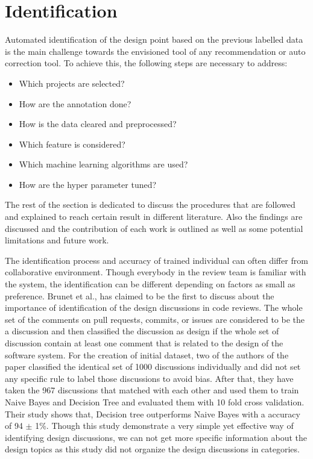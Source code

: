 \section{Identification}
\label{sect:identification}
Automated identification of the design point based on the previous labelled data is the main challenge towards the envisioned tool of any recommendation or auto correction tool. To achieve this, the following steps are necessary to address: \begin{itemize}
	\item Which projects are selected?
	\item How are the annotation done?
	\item How is the data cleared and preprocessed?
	\item Which feature is considered?
	\item Which machine learning algorithms are used?
	\item How are the hyper parameter tuned? \end{itemize}
The rest of the section is dedicated to discuss the procedures that are followed and explained to reach certain result in different literature. Also the findings are discussed and the contribution of each work is outlined as well as some potential limitations and future work. 
 
The identification process and accuracy of trained individual can often differ from collaborative environment. Though everybody in the review team is familiar \cite{Sousa2017} with the system, the identification can be different depending on factors as small as preference. Brunet et al.,\cite{Brunet2014a} has claimed to be the first to discuss about the importance of identification of the design discussions in code reviews. The whole set of the comments on pull requests, commits, or issues are considered to be the a discussion and then classified the discussion as design if the whole set of discussion contain at least one comment that is related to the design of the software system. For the creation of initial dataset, two of the authors of the paper classified the identical set of 1000 discussions individually and did not set any specific rule to label those discussions to avoid bias. After that, they have taken the 967 discussions that matched with each other and used them to train Naive Bayes and Decision Tree and evaluated them with 10 fold cross validation. Their study shows that, Decision tree outperforms Naive Bayes with a accuracy of 94 {$\pm$} 1\%. Though this study demonstrate a very simple yet effective way of identifying design discussions, we can not get more specific information about the design topics as this study did not organize the design discussions in categories. 

